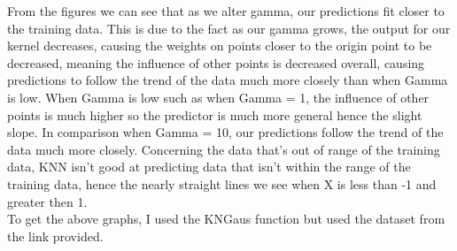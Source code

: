 \documentclass[11pt]{article} %
\begin{document}
\begin{figure}[h]
\qquad
{}
\end{figure}
From the figures we can see that as we alter gamma, our predictions fit closer to the training data. This is due to the fact as our gamma grows, the output for our kernel decreases, causing the weights on points closer to the origin point to be decreased, meaning the influence of other points is decreased overall, causing predictions to follow the trend of the data much more closely than when Gamma is low. When Gamma is low such as when Gamma = 1, the influence of other points is much higher so the predictor is much more general hence the slight slope. In comparison when Gamma = 10, our predictions follow the trend of the data much more closely. Concerning the data that's out of range of the training data, KNN isn't good at predicting data that isn't within the range of the training data, hence the nearly straight lines we see when X is less than -1 and greater then 1. 
\\
To get the above graphs, I used the KNGaus function but used the dataset from the link provided.
\end{document}
